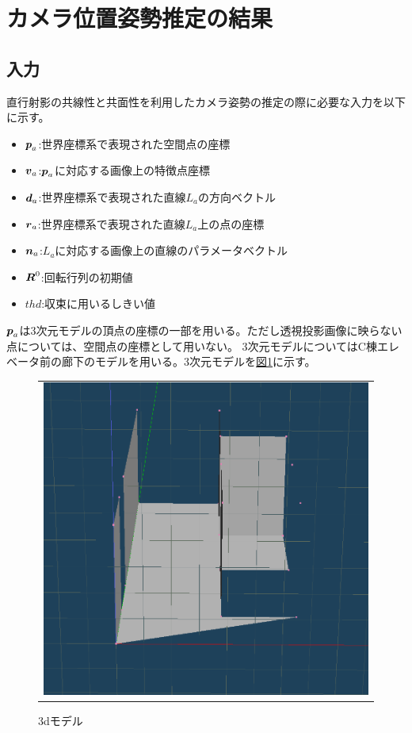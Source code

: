 \documentclass[]{jarticle}          %
\begin{document}
\section{カメラ位置姿勢推定の結果}
\subsection{入力}
直行射影の共線性と共面性を利用したカメラ姿勢の推定の際に必要な入力を以下に示す。
\begin{itemize}
  \item $\mbox{\boldmath $p$}_a$:世界座標系で表現された空間点の座標
  \item $\mbox{\boldmath $v$}_a$:$\mbox{\boldmath $p$}_a$に対応する画像上の特徴点座標
  \item $\mbox{\boldmath $d$}_a$:世界座標系で表現された直線$L_a$の方向ベクトル
  \item $\mbox{\boldmath $r$}_a$:世界座標系で表現された直線$L_a$上の点の座標
  \item $\mbox{\boldmath $n$}_a$:$L_a$に対応する画像上の直線のパラメータベクトル
  \item $\mbox{\boldmath $R$}^0$:回転行列の初期値
  \item $thd$:収束に用いるしきい値
\end{itemize}
$\mbox{\boldmath $p$}_a$は3次元モデルの頂点の座標の一部を用いる。ただし透視投影画像に映らない点については、空間点の座標として用いない。
3次元モデルについてはC棟エレベータ前の廊下のモデルを用いる。3次元モデルを\hyperref[three]{図\ref{three}}に示す。
\begin{figure}[!ht]
  \begin{center}
    \begin{tabular}{c}
      \includegraphics[keepaspectratio, scale=0.3]{figures/3dmodel.png}
    \end{tabular}
  \end{center}
  \caption{3dモデル}
  \label{three}
\end{figure}
\end{document}
